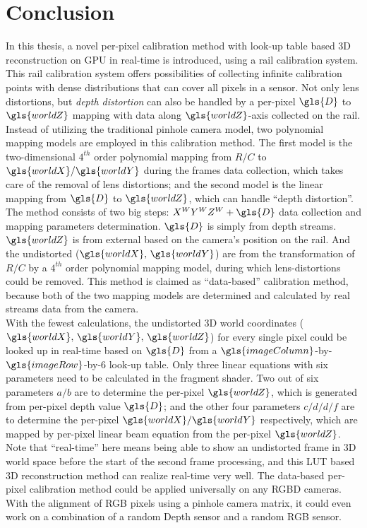 \section{Conclusion}
\indent
In this thesis, a novel per-pixel calibration method with look-up table based \gls{3D} reconstruction on \gls{GPU} in real-time is introduced, using a rail calibration system. This rail calibration system offers possibilities of collecting infinite calibration points with dense distributions that can cover all pixels in a sensor. Not only lens distortions, but \emph{depth distortion} can also be handled by a per-pixel \(\gls{D}\) to \(\gls{worldZ}\) mapping with data along \(\gls{worldZ}\)-axis collected on the rail. Instead of utilizing the traditional pinhole camera model, two polynomial mapping models are employed in this calibration method. The first model is the two-dimensional \(4^{th}\) order polynomial mapping from \(R/C\) to \(\gls{worldX}/\gls{worldY}\) during the frames data collection, which takes care of the removal of lens distortions; and the second model is the linear mapping from \(\gls{D}\) to \(\gls{worldZ}\), which can handle \enquote{depth distortion}. The method consists of two big steps: \(X^WY^WZ^W+\gls{D}\) data collection and mapping parameters determination. \(\gls{D}\) is simply from depth streams. \(\gls{worldZ}\) is from external based on the camera's position on the rail. And the undistorted (\(\gls{worldX}, \, \gls{worldY}\)) are from the transformation of \(R/C\) by a \(4^{th}\) order polynomial mapping model, during which lens-distortions could be removed. This method is claimed as \enquote{data-based} calibration method, because both of the two mapping models are determined and calculated by real streams data from the camera. 
\\\indent
With the fewest calculations, the undistorted \gls{3D} world coordinates (\(\gls{worldX}, \, \gls{worldY}, \, \gls{worldZ}\)) for every single pixel could be looked up in real-time based on \(\gls{D}\) from a \(\gls{imageColumn}\)-by-\(\gls{imageRow}\)-by-\(6\) look-up table. Only three linear equations with six parameters need to be calculated in the fragment shader. Two out of six parameters \(a/b\) are to determine the per-pixel \(\gls{worldZ}\), which is generated from per-pixel depth value \(\gls{D}\); and the other four parameters \(c/d/d/f\) are to determine the per-pixel \(\gls{worldX}/\gls{worldY}\) respectively, which are mapped by per-pixel linear beam equation from the per-pixel \(\gls{worldZ}\). Note that \enquote{real-time} here means being able to show an undistorted frame in \gls{3D} world space before the start of the second frame processing, and this \gls{LUT} based \gls{3D} reconstruction method can realize real-time very well. The data-based per-pixel calibration method could be applied universally on any \gls{RGBD} cameras. With the alignment of RGB pixels using a pinhole camera matrix, it could even work on a combination of a random Depth sensor and a random RGB sensor.
